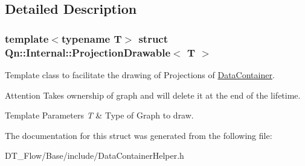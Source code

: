 \subsection{Detailed Description}
\subsubsection*{template$<$typename T$>$\newline
struct Qn\+::\+Internal\+::\+Projection\+Drawable$<$ T $>$}

Template class to facilitate the drawing of Projections of \mbox{\hyperlink{classQn_1_1DataContainer}{Data\+Container}}. 

\begin{DoxyAttention}{Attention}
Takes ownership of graph and will delete it at the end of the lifetime. 
\end{DoxyAttention}

\begin{DoxyTemplParams}{Template Parameters}
{\em T} & Type of Graph to draw. \\
\hline
\end{DoxyTemplParams}


The documentation for this struct was generated from the following file\+:\begin{DoxyCompactItemize}
\item 
D\+T\+\_\+\+Flow/\+Base/include/Data\+Container\+Helper.\+h\end{DoxyCompactItemize}
